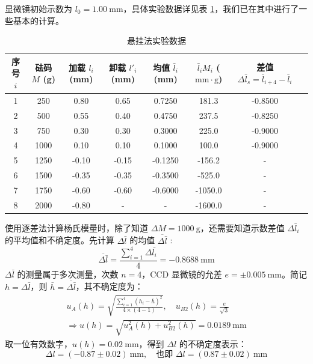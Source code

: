 \documentclass[UTF8]{article}
\theoremstyle{MyLineTheoremStyle} %
\theoremstyle{MyBlockTheoremStyle} %
\theoremstyle{MySubsubsectionStyle} %
\begin{document}
显微镜初始示数为 $l_0 = 1.00 \ \mathrm{mm}$，具体实验数据详见表 \ref{悬挂法实验数据}，我们已在其中进行了一些基本的计算。
\begin{table}[H]\centering
    \caption{悬挂法实验数据}
    \label{悬挂法实验数据}
    \begin{tabular}{cccccccc} 
        \toprule
        序号 $i$ & 砝码 $M$ (g) &  加载 $l_i$ (mm) & 卸载 $l'_i$ (mm) & 均值 $\bar{l}_i$ (mm)  & $\bar{l}_i M_i$ ($\mathrm{mm}\cdot\mathrm{g}$)  & 差值 $\Delta \bar{l}_s = \bar{l}_{i+4} -\bar{l}_{i} $\\
         \midrule
        1 & 250 & 0.80 & 0.65 &  0.7250 & 181.3 & -0.8500 \\
        2 & 500 & 0.55 & 0.40 &  0.4750 &  237.5 & -0.8250 \\
        3 & 750 & 0.30 & 0.30 &  0.3000 & 225.0 & -0.9000 \\
        4 & 1000 & 0.10 & 0.10 &  0.1000 & 100.0 & -0.9000 \\
        5 & 1250 & -0.10 & -0.15 &  -0.1250 &  -156.2 & -\\
        6 & 1500 & -0.35 & -0.35 &  -0.3500 &  -525.0 &  -\\
        7 & 1750 & -0.60 & -0.60 &  -0.6000 &  -1050.0 &  -\\
        8 & 2000 & -0.80 & - & - &  -1600.0 & - \\
        \bottomrule
        \end{tabular}
\end{table}

使用逐差法计算杨氏模量时，除了知道 $\Delta M = 1000 \ \mathrm{g}$，还需要知道示数差值 $\Delta \bar{l}_i$ 的平均值和不确定度。先计算 $\Delta \bar{l}$ 的均值  $\overline{\Delta \bar{l}}$ : 
\begin{equation}
    \overline{\Delta \bar{l}} = \frac{\sum_{i=1}^{4} \Delta \bar{l_i}}{4} = -0.8688 \ \mathrm{mm}
\end{equation}
$\Delta \bar{l}$ 的测量属于多次测量，次数 $n = 4$，CCD 显微镜的允差 $e = \pm 0.005 \ \mathrm{mm}$。简记 $h = \Delta \bar{l}$，则 $\bar{h} = \overline{\Delta \bar{l}}$，其不确定度为：
\begin{gather}
u_A(h) = \sqrt{\frac{\sum_{i=1}^{4}\left(h_i - \overline{h}\right)^2}{4\times (4 - 1)}} ,\quad u_{B2}(h) = \frac{e}{\sqrt{3}} \\ 
\Longrightarrow
u(h) = \sqrt{u_A^2(h) + u_{B2}^2(h)} = 0.0189 \ \mathrm{mm}
\end{gather}
取一位有效数字，$u(h) = 0.02 \ \mathrm{mm}$，得到 $\Delta l $ 的不确定度表示：
\begin{equation}
\Delta l = ( -0.87 \pm 0.02 ) \ \mathrm{mm},\quad \text{也即\ }\Delta l = (0.87 \pm 0.02 ) \ \mathrm{mm}
\end{equation}
\end{document}
